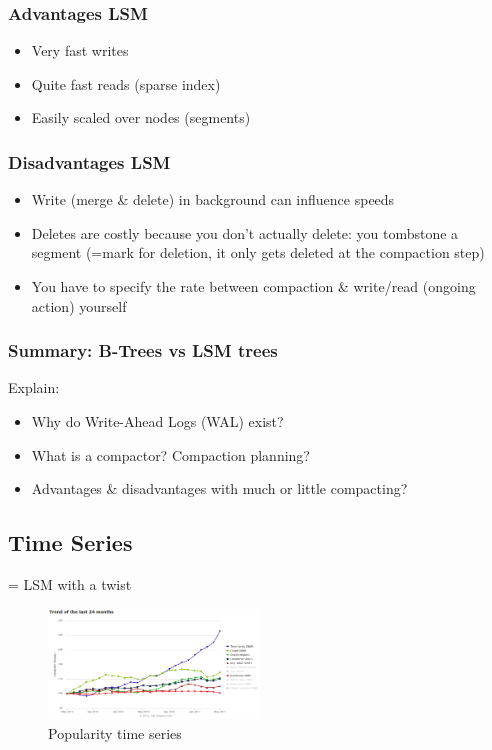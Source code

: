 \documentclass{article}
\begin{document}
\subsubsection{Advantages LSM}

\begin{itemize}
    \item Very fast writes
    \item Quite fast reads (sparse index)
    \item Easily scaled over nodes (segments)
\end{itemize}

\subsubsection{Disadvantages LSM}

\begin{itemize}
    \item Write (merge \& delete) in background can influence speeds
    \item Deletes are costly because you don't actually delete: you tombstone a segment (=mark for deletion, it only gets deleted at the compaction step)
    \item You have to specify the rate between compaction \& write/read (ongoing action) yourself
\end{itemize}

\subsubsection{Summary: B-Trees vs LSM trees}

Explain:

\begin{itemize}
    \item Why do Write-Ahead Logs (WAL) exist?
    \item What is a compactor? Compaction planning?
    \item Advantages \& disadvantages with much or little compacting?
\end{itemize}

\subsection{Time Series}

= LSM with a twist

\begin{figure}[H]
    \centering
    \includegraphics[width=0.5\textwidth]{time-series-lsm.png}
    \caption{Popularity time series}
\end{figure}
\end{document}
